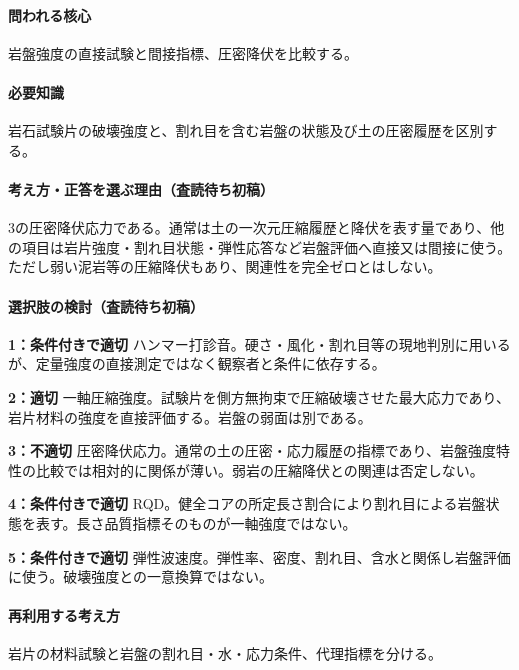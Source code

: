\paragraph{問われる核心} 岩盤強度の直接試験と間接指標、圧密降伏を比較する。

\paragraph{必要知識} 岩石試験片の破壊強度と、割れ目を含む岩盤の状態及び土の圧密履歴を区別する。

\paragraph{考え方・正答を選ぶ理由（査読待ち初稿）} 3の圧密降伏応力である。通常は土の一次元圧縮履歴と降伏を表す量であり、他の項目は岩片強度・割れ目状態・弾性応答など岩盤評価へ直接又は間接に使う。ただし弱い泥岩等の圧縮降伏もあり、関連性を完全ゼロとはしない。

\paragraph{選択肢の検討（査読待ち初稿）}\mbox{}\par

\noindent\textbf{1：条件付きで適切} ハンマー打診音。硬さ・風化・割れ目等の現地判別に用いるが、定量強度の直接測定ではなく観察者と条件に依存する。\par

\noindent\textbf{2：適切} 一軸圧縮強度。試験片を側方無拘束で圧縮破壊させた最大応力であり、岩片材料の強度を直接評価する。岩盤の弱面は別である。\par

\noindent\textbf{3：不適切} 圧密降伏応力。通常の土の圧密・応力履歴の指標であり、岩盤強度特性の比較では相対的に関係が薄い。弱岩の圧縮降伏との関連は否定しない。\par

\noindent\textbf{4：条件付きで適切} RQD。健全コアの所定長さ割合により割れ目による岩盤状態を表す。長さ品質指標そのものが一軸強度ではない。\par

\noindent\textbf{5：条件付きで適切} 弾性波速度。弾性率、密度、割れ目、含水と関係し岩盤評価に使う。破壊強度との一意換算ではない。\par

\paragraph{再利用する考え方} 岩片の材料試験と岩盤の割れ目・水・応力条件、代理指標を分ける。

